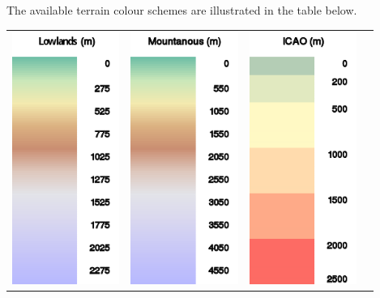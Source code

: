\documentclass[a4paper,12pt]{refrep}
\begin{document}
\begin{maxipage}
The available terrain colour schemes are illustrated in the table below.

\begin{longtable}{c c c c}
\includegraphics[angle=0,width=3.5cm,keepaspectratio='true']{figures/ramp-terrain-flatlands.png}&
\includegraphics[angle=0,width=3.5cm,keepaspectratio='true']{figures/ramp-terrain-mountanous.png}&
\includegraphics[angle=0,width=3.5cm,keepaspectratio='true']{figures/ramp-terrain-icao.png}&

\end{longtable}
\end{maxipage}
\end{document}
